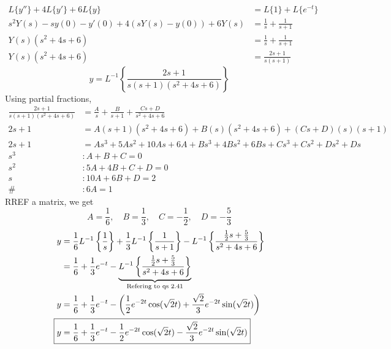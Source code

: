 \documentclass{article}
\begin{document}
\sol
\begin{align*}
  L \{ y'' \} + 4L\{y'\} + 6L\{y\} &= L\{1\} + L\{e^{-t}\} \\
  s^2 Y(s) - sy(0) - y'(0) + 4\left(sY(s) - y(0)\right) + 6Y(s) &= \frac{1}{s} + \frac{1}{s+1} \\
  Y(s) (s^2 + 4s + 6) &= \frac{1}{s} + \frac{1}{s+1} \\
  Y(s) (s^2 + 4s + 6) &= \frac{2s+1}{s(s+1)}
\end{align*}
$$ y = L^{-1}\left\{\frac{2s+1}{s(s+1)(s^2+4s+6)}\right\} $$
Using partial fractions,
\begin{align*}
  \frac{2s+1}{s (s+1) (s^2+4s+6)} &= \frac{A}{s} + \frac{B}{s+1} + \frac{Cs+D}{s^2+4s+6} \\
  2s+1 &= A(s+1)(s^2+4s+6) + B(s)(s^2+4s+6) + (Cs+D)(s)(s+1) \\
  2s+1 &= As^3 + 5 As^2 + 10 As + 6A + Bs^3 + 4Bs^2 + 6Bs + Cs^3 + Cs^2 + Ds^2 + Ds \\
  s^3 &: A + B + C = 0 \\
  s^2 &: 5A + 4B + C + D = 0 \\
  s &: 10A + 6B + D = 2 \\
  \# &: 6A = 1
\end{align*}
RREF a matrix, we get
$$A = \frac{1}{6}, \quad B = \frac{1}{3}, \quad C = -\frac{1}{2}, \quad D = -\frac{5}{3}$$
\begin{align*}
  y &= \frac{1}{6} L^{-1}\left\{\frac{1}{s}\right\} + \frac{1}{3} L^{-1}\left\{\frac{1}{s+1}\right\} - L^{-1} \left\{\frac{\frac{1}{2}s + \frac{5}{3}}{s^2+4s+6}\right\} \\
  &= \frac{1}{6} + \frac{1}{3} e^{-t} - \underbrace{L^{-1} \left\{\frac{\frac{1}{2}s + \frac{5}{3}}{s^2+4s+6}\right\}}_{\text{Refering to qs 2.41}} \\
  y &= \frac{1}{6} + \frac{1}{3} e^{-t} - \left( \frac{1}{2} e^{-2t} \cos (\sqrt{2}t) + \frac{\sqrt{2}}{3} e^{-2t} \sin(\sqrt{2}t) \right) \\
  \Aboxed{y &= \frac{1}{6} + \frac{1}{3} e^{-t} - \frac{1}{2} e^{-2t} \cos (\sqrt{2}t) - \frac{\sqrt{2}}{3} e^{-2t} \sin(\sqrt{2}t)}
\end{align*}

\end{document}
